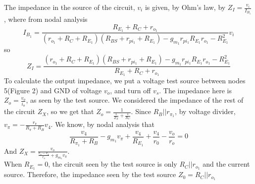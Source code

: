 The impedance in the source of the circuit, $v_i$ is given, by Ohm's law, by $Z_I=\frac{v_i}{I_{B_1}}$, where from nodal analysis 
\begin{equation}
    I_{B_1}=\frac{R_{E_1}+R_C+r_{o_1}}{(r_{o_1}+R_C+R_{E_1})(R_{BS}+r_{pi_1}+R_{E_1})-g_{m_1}r_{pi_1}R_{E_1}r_{o_1}-R_{E_1}^2}v_i
\end{equation}
so 
\begin{equation}\label{eq:zi}
Z_I=\frac{(r_{o_1}+R_C+R_{E_1})(R_{BS}+r_{pi_1}+R_{E_1})-g_{m_1}r_{pi_1}R_{E_1}r_{o_1}-R_{E_1}^2}{R_{E_1}+R_C+r_{o_1}}
\end{equation}
To calculate the output impedance, we put a voltage test source between nodes 5(Figure 2) and GND of voltage $v_o$, and turn off $v_s$. The impedance here is $Z_o=\frac{v_o}{i_o}$, as seen by the test source. We considered the impedance of the rest of the circuit $Z_X$, so we get that $Z_o=\frac{1}{\frac{1}{Z_X}+\frac{1}{R_C}}$.
Since $R_{B}||r_{\pi_1}$, by voltage divider, $v_\pi=-\frac{r_{\pi}}{R_\pi +R_B}v_4$.
We know, by nodal analysis that 
\begin{equation}
\frac{v_4}{R_{\pi_1}+R_B}-g_{m_1}v_\pi+\frac{v_4}{R_{E_1}}+\frac{v_4}{r_0}-\frac{v_o}{r_o}=0
\end{equation}
And $Z_X=\frac{v_o}{\frac{v_o-v_4}{r_o}+g_{m_1}v_\pi}$.\\
When $R_{E_1}=0$, the circuit seen by the test source is only $R_{C}||r_{o_1}$ and the current source. Therefore, the impedance seen by the test source $Z_0=R_{C}||r_{o_1}$
